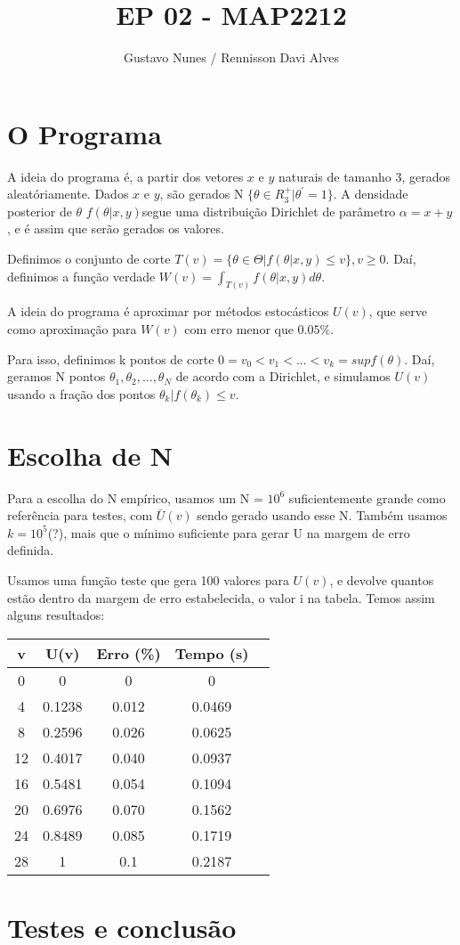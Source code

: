 \documentclass{article}
\date{}
\title{\vspace{-2.0cm}EP 02 - MAP2212}
\author{Gustavo Nunes / Rennisson Davi Alves}
\begin{document}
		\maketitle
	
	\section{O Programa}
	A ideia do programa é, a partir dos vetores $x$ e $y$ naturais de tamanho 3, gerados aleatóriamente. Dados $x$ e $y$, são gerados N $\{\theta \in R_3^+ | \theta^{'}=1 \}$. A densidade posterior de $\theta$ $f(\theta|x, y)$segue uma distribuição Dirichlet de parâmetro $\alpha = x + y$, e é assim que serão gerados os valores. 
	
	Definimos o conjunto de corte $T(v) = \{\theta \in \Theta | f(\theta | x, y) \leq v\}, v\geq0$. Daí, definimos a função verdade $W(v) = \int_{T(v)}f(\theta|x, y)d\theta$. 
	
	A ideia do programa é aproximar por métodos estocásticos $U(v)$, que serve como aproximação para $W(v)$ com erro menor que $0.05\%$. 
	
	Para isso, definimos k pontos de corte $0 = v_0 < v_1 < ... < v_k = sup f(\theta)$. Daí, geramos N pontos $\theta_1, \theta_2, ..., \theta_N$ de acordo com a Dirichlet, e simulamos $U(v)$ usando a fração dos pontos $\theta_k | f(\theta_k)  \leq v $. 
	
	\section{Escolha de N}
	
	Para a escolha do N empírico, usamos um N = $10^{6}$ suficientemente grande como referência para testes, com $\bar{U}(v)$ sendo gerado usando esse N. Também usamos $k = 10^5$(?), mais que o mínimo suficiente para gerar U na margem de erro definida. 
	
	Usamos uma função teste que gera 100 valores para $U(v)$, e devolve quantos estão dentro da margem de erro estabelecida, o valor i na tabela. Temos assim alguns resultados: 
 
	\begin{table}[htbp]
		\begin{tabular}{|c|c|c|c|c|}
			v & U(v) & Erro (\%) & Tempo (s)\\
			\hline
			0 & 0 & 0 & 0\\	
			4 & 0.1238 & 0.012 & 0.0469\\
			8 & 0.2596 & 0.026 & 0.0625\\
                12 & 0.4017 & 0.040 & 0.0937\\
                16 & 0.5481 & 0.054 & 0.1094\\
                20 & 0.6976 & 0.070 & 0.1562\\
                24 & 0.8489 & 0.085 & 0.1719\\
                28 & 1 & 0.1 & 0.2187\\
		\end{tabular}
	\end{table}
 

	\section{Testes e conclusão}
\end{document}
